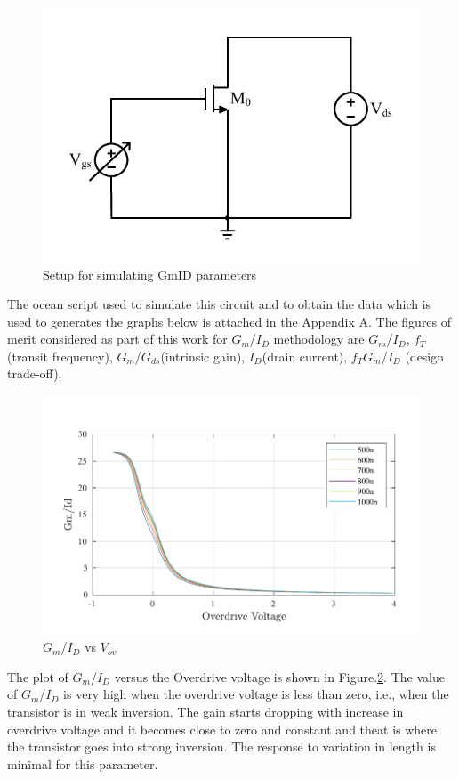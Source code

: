 \begin{figure} [H]
\centering
\includegraphics[scale=1]{Figures/Misc/PDFs/GmID_NMOS.pdf}
\caption{Setup for simulating GmID parameters}
\label{fig:GmID_Ckt}
\end{figure}
The ocean script used to simulate this circuit and to obtain the data which is used to generates the graphs below is attached in the Appendix A. The figures of merit considered as part of this work for $G_m$/$I_D$ methodology are $G_m$/$I_D$, $f_T$(transit frequency), $G_m$/$G_{ds}$(intrinsic gain), $I_D$(drain current), $f_TG_m$/$I_D$ (design trade-off).

\begin{figure} [H]
\centering
\includegraphics[scale=1]{Figures/Misc/PDFs/nmos_len_vovgmid.pdf}
\caption{$G_m$/$I_D$ vs $V_{ov}$}
\label{fig:vovgmid}
\end{figure}

The plot of $G_m$/$I_D$ versus the Overdrive voltage is shown in Figure.\ref{fig:vovgmid}. 
The value of $G_m$/$I_D$ is very high when the overdrive voltage is less than zero, i.e., when the transistor is in weak inversion. The gain starts dropping with increase in overdrive voltage and it becomes close to zero and constant and theat is where the transistor goes into strong inversion. The response to variation in length is minimal for this parameter.

